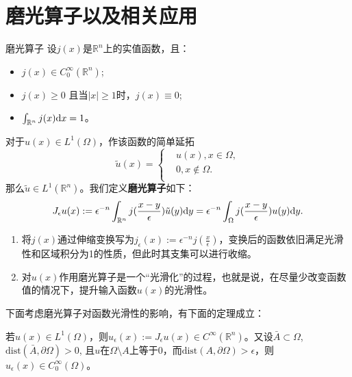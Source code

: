 \section{磨光算子以及相关应用}
\begin{definition}{磨光算子}
    \label{def:smoother}
    设$j(x)$是$\mathbb{R}^{n}$上的实值函数，且：
    \begin{itemize}
        \item $j(x)\in C_{0}^{\infty}(\mathbb{R}^{n})$;
        \item $j(x)\ge 0 $ 且当$|x|\ge 1$时，$j(x)\equiv 0$;
        \item $\int_{\mathbb{R}^{n}}j(x)\mathrm{d} x=1$。
    \end{itemize}
    对于$u(x)\in L^{1}(\Omega)$，作该函数的简单延拓
    \begin{equation}
        \tilde{u}(x)=\left\{
            \begin{aligned}
                &u(x),x\in\Omega,\\
                &0,x\notin\Omega.\\
            \end{aligned}
        \right.
    \end{equation}
    那么$\tilde{u}\in L^{1}(\mathbb{R}^{n})$。我们定义\textbf{磨光算子}如下：
    \begin{equation}
        \label{eq:smoother}
        J_{\epsilon}u(x):=\epsilon^{-n}\int_{\mathbb{R}^{n}}j(\frac{x-y}{\epsilon})\tilde{u}(y)\mathrm{d} y=\epsilon^{-n}\int_{\Omega}j(\frac{x-y}{\epsilon})u(y)\mathrm{d} y.
    \end{equation}
\end{definition}
\begin{remark}
    \begin{enumerate}
        \item 将$j(x)$通过伸缩变换写为$j_{\epsilon}(x):=\epsilon^{-n}j(\frac{x}{\epsilon})$，变换后的函数依旧满足光滑性和区域积分为1的性质，但此时其支集可以进行收缩。
        \item 对$u(x)$作用磨光算子是一个“光滑化”的过程，也就是说，在尽量少改变函数值的情况下，提升输入函数$u(x)$的光滑性。
    \end{enumerate}
\end{remark}
下面考虑磨光算子对函数光滑性的影响，有下面的定理成立：
\begin{theorem}
    若$u(x)\in L^{1}(\Omega)$，则$u_{\epsilon}(x):=J_{\epsilon}u(x)\in C^{\infty}(\mathbb{R}^{n})$。又设$\bar{A}\subset \Omega$, $\text{dist}(\bar{A},\partial\Omega)>0$, 且$u$在$\Omega\setminus A$上等于0，而$\text{dist}(A,\partial\Omega)>\epsilon$，则$u_{\epsilon}(x)\in C_{0}^{\infty}(\Omega)$。
\end{theorem}
